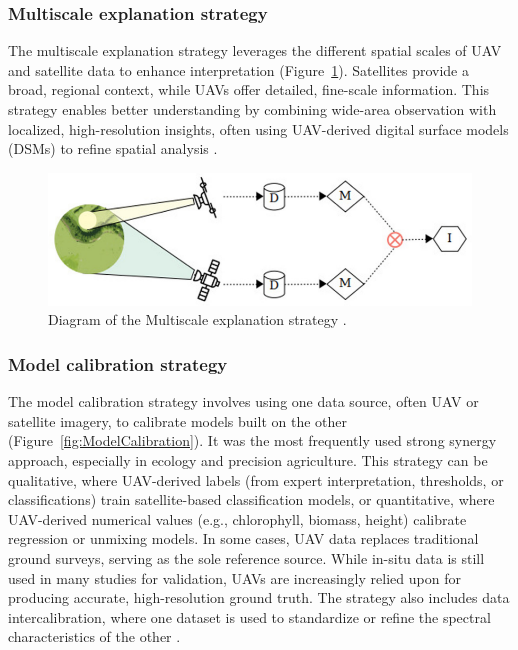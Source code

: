 \subsubsection{Multiscale explanation strategy}
The multiscale explanation strategy leverages the different spatial scales of UAV and satellite data to enhance interpretation (Figure~\ref{fig:MultiscaleExplanation}). Satellites provide a broad, regional context, while UAVs offer detailed, fine-scale information. This strategy enables better understanding by combining wide-area observation with localized, high-resolution insights, often using UAV-derived digital surface models (DSMs) to refine spatial analysis \parencite{AlvarezVanhard2021}.

\begin{figure}[H]
    \centering
    \includegraphics[width=0.6
    \textwidth]{chapters/chapter3/images/Figure13.png}
    \caption{Diagram of the Multiscale explanation strategy \parencite{AlvarezVanhard2021}.}
    \label{fig:MultiscaleExplanation}
\end{figure}

\subsubsection{Model calibration strategy}
The model calibration strategy involves using one data source, often UAV or satellite imagery, to calibrate models built on the other (Figure~\ref{fig:ModelCalibration}). It was the most frequently used strong synergy approach, especially in ecology and precision agriculture. This strategy can be qualitative, where UAV-derived labels (from expert interpretation, thresholds, or classifications) train satellite-based classification models, or quantitative, where UAV-derived numerical values (e.g., chlorophyll, biomass, height) calibrate regression or unmixing models. In some cases, UAV data replaces traditional ground surveys, serving as the sole reference source. While in-situ data is still used in many studies for validation, UAVs are increasingly relied upon for producing accurate, high-resolution ground truth. The strategy also includes data intercalibration, where one dataset is used to standardize or refine the spectral characteristics of the other \parencite{AlvarezVanhard2021}.


